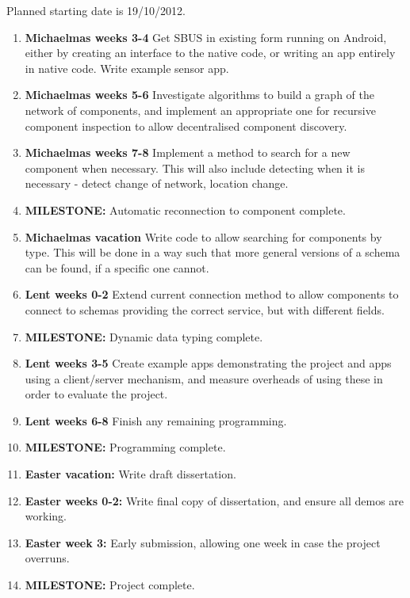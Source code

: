 Planned starting date is 19/10/2012.

\begin{enumerate}

\item {\bf Michaelmas weeks 3-4} Get SBUS in existing form running on Android, either by creating an interface to the native code, or writing an app entirely in native code. Write example sensor app.

\item {\bf Michaelmas weeks 5-6} Investigate algorithms to build a graph of the network of components, and implement an appropriate one for recursive component inspection to allow decentralised component discovery.

\item {\bf Michaelmas weeks 7-8} Implement a method to search for a new component when necessary. This will also include detecting when it is necessary - detect change of network, location change.

\item {\bf MILESTONE: } Automatic reconnection to component complete.

\item {\bf Michaelmas vacation} Write code to allow searching for components by type. This will be done in a way such that more general versions of a schema can be found, if a specific one cannot.

\item {\bf Lent weeks 0-2} Extend current connection method to allow components to connect to schemas providing the correct service, but with different fields.

\item {\bf MILESTONE: } Dynamic data typing complete.

\item {\bf Lent weeks 3-5} Create example apps demonstrating the project and apps using a client/server mechanism, and measure overheads of using these in order to evaluate the project.

\item {\bf Lent weeks 6-8} Finish any remaining programming.

\item {\bf MILESTONE: } Programming complete.

\item {\bf Easter vacation:} Write draft dissertation.

\item {\bf Easter weeks 0-2:} Write final copy of dissertation, and ensure all demos are working.

\item {\bf Easter week 3:} Early submission, allowing one week in case the project overruns.

\item {\bf MILESTONE: } Project complete.

\end{enumerate}

